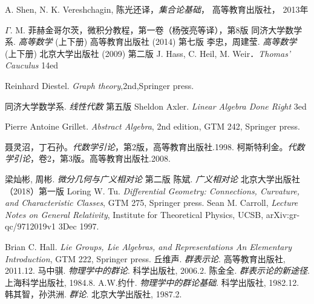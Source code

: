 
\begin{thebibliography}{99}

A. Shen, N. K. Vereshchagin, 陈光还译，\textsl{集合论基础}， 高等教育出版社， 2013年

$\Gamma$. M. 菲赫金哥尔茨，微积分教程，第一卷（杨弢亮等译），第8版
同济大学数学系. \textsl{高等数学} (上下册) 高等教育出版社 (2014) 第七版
李忠，周建莹. \textsl{高等数学} (上下册) 北京大学出版社 (2009) 第二版
J. Hass, C. Heil, M. Weir．\textsl{Thomas' Cauculus} 14ed

Reinhard Diestel. \textsl{Graph theory},2nd,Springer press.


同济大学数学系. \textsl{线性代数} 第五版
Sheldon Axler. \textsl{Linear Algebra Done Right} 3ed

Pierre Antoine Grillet. \textsl{Abstract Algebra}, 2nd edition, GTM 242, Springer press. 

聂灵沼，丁石孙。\textsl{代数学引论}，第2版，高等教育出版社.1998.
柯斯特利金。\textsl{代数学引论}，卷2，第3版。高等教育出版社.2008.

梁灿彬, 周彬. \textsl{微分几何与广义相对论} 第二版
陈斌. \textsl{广义相对论} 北京大学出版社（2018）第一版
Loring W. Tu. \textsl{Differential Geometry: Connections, Curvature, and Characteristic Classes}, GTM 275, Springer press. 
Sean M. Carroll, \textsl{Lecture Notes on General Relativity}, Institute for Theoretical Physics, UCSB, arXiv:gr-qc/9712019v1 3Dec 1997. 

Brian C. Hall. \textsl{Lie Groups, Lie Algebras, and Representations An Elementary Introduction}, GTM 222, Springer press. 
丘维声. \textsl{群表示论}. 高等教育出版社, 2011.12.
马中骐. \textsl{物理学中的群论}. 科学出版社, 2006.2.
陈金全. \textsl{群表示论的新途径}. 上海科学出版社, 1984.8.
A.W.约什. \textsl{物理学中的群论基础}. 科学出版社, 1982.12.
韩其智，孙洪洲. \textsl{群论}. 北京大学出版社, 1987.2.


\end{thebibliography}
